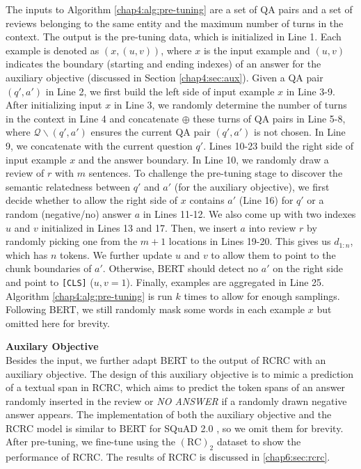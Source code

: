 The inputs to Algorithm \ref{chap4:alg:pre-tuning} are a set of QA pairs and a set of reviews belonging to the same entity and the maximum number of turns in the context. The output is the pre-tuning data, which is initialized in Line 1. 
Each example is denoted as $(x, (u, v))$, where $x$ is the input example and $(u, v)$ indicates the boundary (starting and ending indexes) of an answer for the auxiliary objective (discussed in Section \ref{chap4:sec:aux}).
Given a QA pair $(q', a')$ in Line 2, we first build the left side of input example $x$ in Line 3-9.
After initializing input $x$ in Line 3, we randomly determine the number of turns in the context in Line 4 and concatenate $\oplus$ these turns of QA pairs in Line 5-8, where $\mathcal{Q}\backslash(q', a')$ ensures the current QA pair $(q', a')$ is not chosen.
In Line 9, we concatenate with the current question $q'$.
Lines 10-23 build the right side of input example $x$ and the answer boundary.
In Line 10, we randomly draw a review of $r$ with $m$ sentences. To challenge the pre-tuning stage to discover the semantic relatedness between $q'$ and $a'$ (for the auxiliary objective), we first decide whether to allow the right side of $x$ contains $a'$ (Line 16) for $q'$ or a random (negative/no) answer $a$ in Lines 11-12.
We also come up with two indexes $u$ and $v$ initialized in Lines 13 and 17.
Then, we insert $a$ into review $r$ by randomly picking one from the $m+1$ locations in Lines 19-20.
This gives us $d_{1:n}$, which has $n$ tokens. 
We further update $u$ and $v$ to allow them to point to the chunk boundaries of $a'$.
Otherwise, BERT should detect no $a'$ on the right side and point to \texttt{[CLS]} ($u,v=1$). Finally, examples are aggregated in Line 25.
Algorithm \ref{chap4:alg:pre-tuning} is run $k$ times to allow for enough samplings. 
Following BERT, we still randomly mask some words in each example $x$ but omitted here for brevity.

\textbf{Auxilary Objective}\\
\label{chap4:sec:aux}
Besides the input, we further adapt BERT to the output of RCRC with an auxiliary objective.
The design of this auxiliary objective is to mimic a prediction of a textual span in RCRC, which aims to predict the token spans of an answer randomly inserted in the review or \textit{NO ANSWER} if a randomly drawn negative answer appears.
The implementation of both the auxiliary objective and the RCRC model is similar to BERT for SQuAD 2.0 \cite{rajpurkar2018know}, so we omit them for brevity.
After pre-tuning, we fine-tune using the $(\text{RC})_2$ dataset to show the performance of RCRC.
The results of RCRC is discussed in \ref{chap6:sec:rcrc}.


